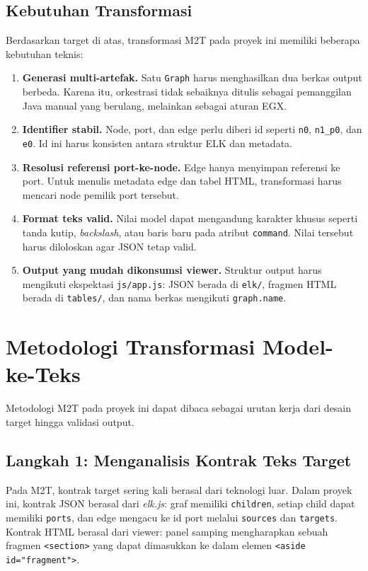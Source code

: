 \subsection{Kebutuhan Transformasi}

Berdasarkan target di atas, transformasi M2T pada proyek ini memiliki beberapa kebutuhan teknis:
\begin{enumerate}
  \item \textbf{Generasi multi-artefak.} Satu \texttt{Graph} harus menghasilkan dua berkas output berbeda. Karena itu, orkestrasi tidak sebaiknya ditulis sebagai pemanggilan Java manual yang berulang, melainkan sebagai aturan EGX.
  \item \textbf{Identifier stabil.} Node, port, dan edge perlu diberi id seperti \texttt{n0}, \texttt{n1\_p0}, dan \texttt{e0}. Id ini harus konsisten antara struktur ELK dan metadata.
  \item \textbf{Resolusi referensi port-ke-node.} Edge hanya menyimpan referensi ke port. Untuk menulis metadata edge dan tabel HTML, transformasi harus mencari node pemilik port tersebut.
  \item \textbf{Format teks valid.} Nilai model dapat mengandung karakter khusus seperti tanda kutip, \textit{backslash}, atau baris baru pada atribut \texttt{command}. Nilai tersebut harus diloloskan agar JSON tetap valid.
  \item \textbf{Output yang mudah dikonsumsi viewer.} Struktur output harus mengikuti ekspektasi \texttt{js/app.js}: JSON berada di \texttt{elk/}, fragmen HTML berada di \texttt{tables/}, dan nama berkas mengikuti \texttt{graph.name}.
\end{enumerate}

\section{Metodologi Transformasi Model-ke-Teks}

Metodologi M2T pada proyek ini dapat dibaca sebagai urutan kerja dari desain target hingga validasi output.

\subsection{Langkah 1: Menganalisis Kontrak Teks Target}

Pada M2T, kontrak target sering kali berasal dari teknologi luar. Dalam proyek ini, kontrak JSON berasal dari \textit{elk.js}: graf memiliki \texttt{children}, setiap child dapat memiliki \texttt{ports}, dan edge mengacu ke id port melalui \texttt{sources} dan \texttt{targets}. Kontrak HTML berasal dari viewer: panel samping mengharapkan sebuah fragmen \texttt{<section>} yang dapat dimasukkan ke dalam elemen \texttt{<aside id="fragment">}.

